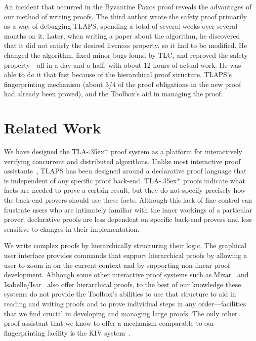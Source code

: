 \documentclass[a4paper]{llncs}
\newcommand{\tlaplus}{\mbox{TLA\kern -.35ex$^+$}\xspace}
\begin{document}
An incident that occurred in the Byzantine Paxos proof reveals the
advantages of our method of writing proofs.  The third author wrote
the safety proof primarily as a way of debugging TLAPS, spending a
total of several weeks over several months on it.  Later, when writing a
paper about the algorithm, he discovered that it did not satisfy the
desired liveness property, so it had to be modified.  He changed the
algorithm, fixed minor bugs found by TLC, and reproved the safety
property---all in a day and a half, with about 12 hours of
actual work.  He was able to do it that fast because of the
hierarchical proof structure, TLAPS's fingerprinting mechanism (about
3/4 of the proof obligations in the new proof had already been
proved), and the Toolbox's aid in managing the proof. 


\section{Related Work}
\label{sec:related}

We have designed the \tlaplus proof system as a platform for interactively
verifying concurrent and distributed algorithms. Unlike
most interactive proof assistants~\cite{wiedijk:provers}, TLAPS has been
designed around a declarative proof language that is independent of any specific proof
back-end. \tlaplus proofs indicate what facts are needed to prove a certain
result, but they do not specify precisely how the back-end provers should use
these facts. %
Although this lack of fine control can frustrate users who are intimately
familiar with the inner workings of a particular prover,
declarative proofs are less dependent on specific back-end provers and
less sensitive to changes in their implementation.

We write complex proofs by hierarchically structuring their logic. 
The graphical user interface provides commands that support hierarchical proofs
by allowing a user to zoom in on the current context and by supporting
non-linear proof development. Although some other interactive proof systems such
as Mizar~\cite{trybulec:mizar} and Isabelle/Isar~\cite{wenzel:isar} also offer
hierarchical proofs, to the best of our knowledge these systems do not provide
the Toolbox's abilities to use that structure to aid in reading and writing
proofs and to prove individual steps in any order---facilities that we find
crucial in developing and managing large proofs. The only other proof
assistant that we know to offer a mechanism comparable to our fingerprinting
facility is the KIV system~\cite{balser:kiv}.
\end{document}

